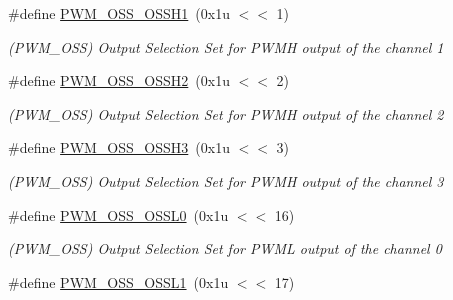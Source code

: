 \begin{DoxyCompactItemize}
\mbox{\label{group__SAMS70__PWM_ga8dace49061f8c9618e0aa69286efaf67}} 
\#define \mbox{\hyperlink{group__SAMS70__PWM_ga8dace49061f8c9618e0aa69286efaf67}{P\+W\+M\+\_\+\+O\+S\+S\+\_\+\+O\+S\+S\+H1}}~(0x1u $<$$<$ 1)
\begin{DoxyCompactList}\small\item\em (P\+W\+M\+\_\+\+O\+SS) Output Selection Set for P\+W\+MH output of the channel 1 \end{DoxyCompactList}\item 
\mbox{\label{group__SAMS70__PWM_ga45be524b44aa437dd5b450c73453673e}} 
\#define \mbox{\hyperlink{group__SAMS70__PWM_ga45be524b44aa437dd5b450c73453673e}{P\+W\+M\+\_\+\+O\+S\+S\+\_\+\+O\+S\+S\+H2}}~(0x1u $<$$<$ 2)
\begin{DoxyCompactList}\small\item\em (P\+W\+M\+\_\+\+O\+SS) Output Selection Set for P\+W\+MH output of the channel 2 \end{DoxyCompactList}\item 
\mbox{\label{group__SAMS70__PWM_gac3dd2a5be39e742b7fb03897a7469460}} 
\#define \mbox{\hyperlink{group__SAMS70__PWM_gac3dd2a5be39e742b7fb03897a7469460}{P\+W\+M\+\_\+\+O\+S\+S\+\_\+\+O\+S\+S\+H3}}~(0x1u $<$$<$ 3)
\begin{DoxyCompactList}\small\item\em (P\+W\+M\+\_\+\+O\+SS) Output Selection Set for P\+W\+MH output of the channel 3 \end{DoxyCompactList}\item 
\mbox{\label{group__SAMS70__PWM_gaaf27227163d1b122a0851ec9e8ca8675}} 
\#define \mbox{\hyperlink{group__SAMS70__PWM_gaaf27227163d1b122a0851ec9e8ca8675}{P\+W\+M\+\_\+\+O\+S\+S\+\_\+\+O\+S\+S\+L0}}~(0x1u $<$$<$ 16)
\begin{DoxyCompactList}\small\item\em (P\+W\+M\+\_\+\+O\+SS) Output Selection Set for P\+W\+ML output of the channel 0 \end{DoxyCompactList}\item 
\mbox{\label{group__SAMS70__PWM_ga7d2aa22a2ea9308f31791f9df7d568df}} 
\#define \mbox{\hyperlink{group__SAMS70__PWM_ga7d2aa22a2ea9308f31791f9df7d568df}{P\+W\+M\+\_\+\+O\+S\+S\+\_\+\+O\+S\+S\+L1}}~(0x1u $<$$<$ 17)
$$
\end{DoxyCompactItemize}
